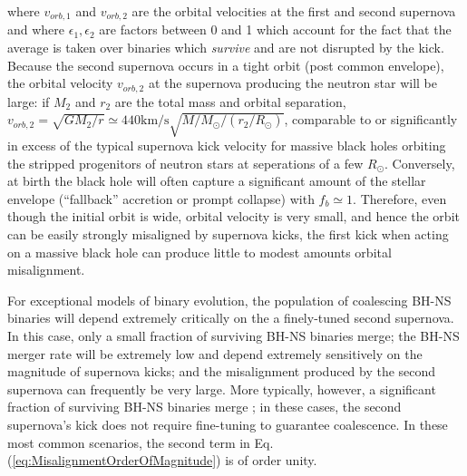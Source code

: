 \documentclass[nofootinbib,twocolumn,prd]{emulateapj}
\newcommand\unit[1]{\text{#1}}
\begin{document}
where $v_{orb,1}$ and $v_{orb,2}$ are the orbital velocities at the first and second supernova and where
$\epsilon_1,\epsilon_2$ are factors between 0 and 1 which account for the fact that the average is taken over binaries which \emph{survive} and are not
disrupted by the kick.  Because the second supernova  occurs in a tight orbit (post common
envelope),  the orbital velocity $v_{orb,2}$ at the supernova producing the neutron
star will be  large:  if $M_2$ and $r_2$ are the total mass and orbital separation, $v_{orb,2}=\sqrt{GM_{2}/r}\simeq
440\unit{km/s} \sqrt{M/M_\odot/(r_2/R_\odot)}$, 
comparable to or
significantly in excess of the typical supernova kick velocity for massive black holes orbiting the stripped progenitors of
neutron stars at seperations of a few $R_\odot$.  Conversely, at birth the black hole will often capture a significant
amount of the stellar envelope (``fallback'' accretion or prompt collapse) with $f_b\simeq 1$.  Therefore, even though
the initial orbit is wide, orbital  velocity is very small, and hence the orbit can be easily strongly misaligned by
supernova kicks,  the first kick when acting on a massive black hole can produce little to  modest amounts orbital
misalignment.  

For exceptional models of binary evolution, the population of coalescing BH-NS binaries will depend extremely critically on the
a finely-tuned second supernova.  In this case, only a small fraction of surviving BH-NS binaries merge; the BH-NS merger rate will be extremely low and  depend extremely sensitively on
the magnitude of supernova kicks; and the misalignment produced by the second supernova can frequently be very large.  More typically, however, a significant fraction of surviving BH-NS binaries merge
\citep{2008ApJ...675..566O,popsyn-LowMetallicityImpact2-StarTrackRevised-2012,popsyn-LowMetallicityImpact2b-StarTrackRevised-2013,popsyn-LowMetallicityImpact2c-StarTrackRevised-2014}; in these cases, the  second supernova's kick does not require fine-tuning to guarantee
coalescence.   In these most common scenarios, the second term in Eq. (\ref{eq:MisalignmentOrderOfMagnitude}) is of
order unity.  
\end{document}
